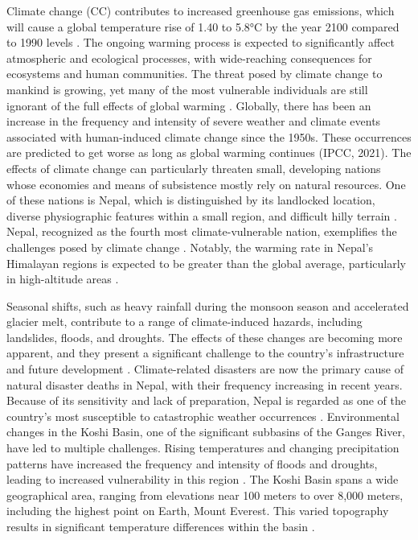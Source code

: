 Climate change (CC) contributes to increased greenhouse gas emissions, which will cause a global temperature rise of 1.40 to 5.8°C by the year 2100 compared to 1990 levels \citep{mccarthy_climate_2001}. The ongoing warming process is expected to significantly affect atmospheric and ecological processes, with wide-reaching consequences for ecosystems and human communities. The threat posed by climate change to mankind is growing, yet many of the most vulnerable individuals are still ignorant of the full effects of global warming \citep{maharjan_tharu_nodate}. Globally, there has been an increase in the frequency and intensity of severe weather and climate events associated with human-induced climate change since the 1950s. These occurrences are predicted to get worse as long as global warming continues \citep{intergovernmental_panel_on_climate_change_ipcc_climate_2023} (IPCC, 2021).
The effects of climate change can particularly threaten small, developing nations whose economies and means of subsistence mostly rely on natural resources. One of these nations is Nepal, which is distinguished by its landlocked location, diverse physiographic features within a small region, and difficult hilly terrain \citep{shrestha_climate_2011}. Nepal, recognized as the fourth most climate-vulnerable nation, exemplifies the challenges posed by climate change \citep{manandhar_adapting_2011,reilly_climate_in_usa}. Notably, the warming rate in Nepal's Himalayan regions is expected to be greater than the global average, particularly in high-altitude areas \citep{casestudy_bhattarai,yao_recent_2019,shrestha_maximum_1999}.


Seasonal shifts, such as heavy rainfall during the monsoon season and accelerated glacier melt, contribute to a range of climate-induced hazards, including landslides, floods, and droughts. The effects of these changes are becoming more apparent, and they present a significant challenge to the country’s infrastructure and future development \citep{pokhrel_climate_2013}. Climate-related disasters are now the primary cause of natural disaster deaths in Nepal, with their frequency increasing in recent years. Because of its sensitivity and lack of preparation, Nepal is regarded as one of the country’s most susceptible to catastrophic weather occurrences \citep{aksha_spatial_2018}. Environmental changes in the Koshi Basin, one of the significant subbasins of the Ganges River, have led to multiple challenges. Rising temperatures and changing precipitation patterns have increased the frequency and intensity of floods and droughts, leading to increased vulnerability in this region \citep{bastakoti_agriculture_2017}. The Koshi Basin spans a wide geographical area, ranging from elevations near 100 meters to over 8,000 meters, including the highest point on Earth, Mount Everest. This varied topography results in significant temperature differences within the basin \citep{bhatt_climate_2014}.



